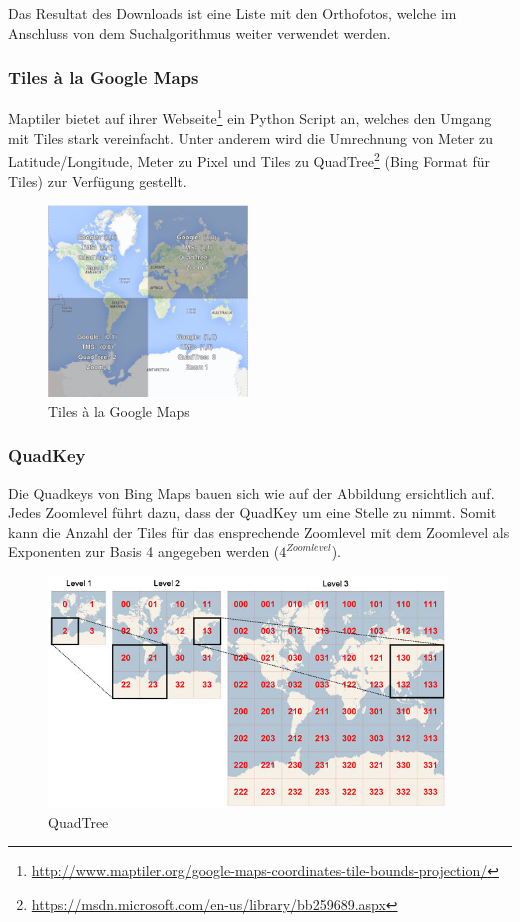 Das Resultat des Downloads ist eine Liste mit den Orthofotos, welche im Anschluss von dem Suchalgorithmus weiter verwendet werden.

\subsubsection{Tiles à la Google Maps}
\label{subsec:tiles}
\Gls{Maptiler} bietet auf ihrer Webseite\footnote{\url{http://www.maptiler.org/google-maps-coordinates-tile-bounds-projection/}} ein Python Script an, welches den Umgang mit Tiles stark vereinfacht. Unter anderem wird die Umrechnung von Meter zu Latitude/Longitude, Meter zu Pixel und Tiles zu QuadTree\footnote{\url{https://msdn.microsoft.com/en-us/library/bb259689.aspx}} (Bing Format für Tiles) zur Verfügung gestellt.\\

\begin{figure}[H]
	\centering
	\includegraphics[width=150pt]{images/tiles_a_la_google.png}
	\caption[Tiles à la Google Maps]{Tiles à la Google Maps}
\end{figure}

\subsubsection{QuadKey}
Die \Gls{Quadkeys} von Bing Maps bauen sich wie auf der Abbildung ersichtlich auf. Jedes Zoomlevel führt dazu, dass der QuadKey um eine Stelle zu nimmt. Somit kann die Anzahl der Tiles für das ensprechende Zoomlevel mit dem Zoomlevel als Exponenten zur Basis 4 angegeben werden ($4^{Zoomlevel}$).  \\
\begin{figure}[H]
	\centering
	\includegraphics[width=300pt]{images/quadkey.png}
	\caption[QuadTree]{QuadTree}
\end{figure}
\newpage
